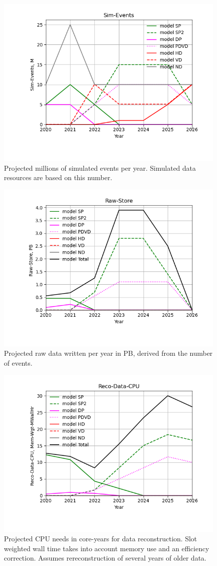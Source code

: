 \begin{figure}[h]
\centering\includegraphics[height=0.4\textwidth]{MoreSim_2022-12-02-2026/MoreSim_2022-12-02-2026-Sim-Events.png}
\caption{Projected millions of simulated events per year. Simulated data resources are based on this number. }
\label{fig:Sim-Events}
\end{figure}
\begin{figure}[h]
\centering\includegraphics[height=0.4\textwidth]{MoreSim_2022-12-02-2026/MoreSim_2022-12-02-2026-Raw-Store.png}
\caption{Projected raw data written per year in PB, derived from the number of events.}
\label{fig:Raw-Store}
\end{figure}
\begin{figure}[h]
\centering\includegraphics[height=0.4\textwidth]{MoreSim_2022-12-02-2026/MoreSim_2022-12-02-2026-Reco-Data-CPU.png}
\caption{Projected CPU needs in core-years for data reconstruction.              Slot weighted wall time takes into account memory use and an efficiency correction.  Assumes rereconstruction of several years of older data.}
\label{fig:Reco-Data-CPU}
\end{figure}
